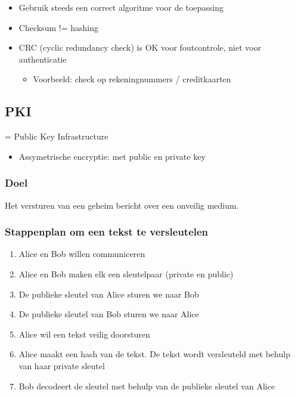 \documentclass{article}
\begin{document}
\begin{itemize}
    \item Gebruik steeds een correct algoritme voor de toepassing
    \item Checksum != hashing
    \item CRC (cyclic redundancy check) is OK voor foutcontrole, niet voor authenticatie
    \begin{itemize}
        \item Voorbeeld: check op rekeningnummers / creditkaarten
    \end{itemize} 
\end{itemize}

\subsection{PKI}

= Public Key Infrastructure

\begin{itemize}
    \item Assymetrische encryptie: met public en private key
\end{itemize}

\subsubsection{Doel}

Het versturen van een geheim bericht over een onveilig medium.

\subsubsection{Stappenplan om een tekst te versleutelen}

\begin{enumerate}
    \item Alice en Bob willen communiceren
    \item Alice en Bob maken elk een sleutelpaar (private en public)
    \item De publieke sleutel van Alice sturen we naar Bob
    \item De publieke sleutel van Bob sturen we naar Alice
    \item Alice wil een tekst veilig doorsturen
    \item Alice maakt een hash van de tekst. De tekst wordt versleuteld met behulp van haar private sleutel
    \item Bob decodeert de sleutel met behulp van de publieke sleutel van Alice
\end{enumerate}
\end{document}
